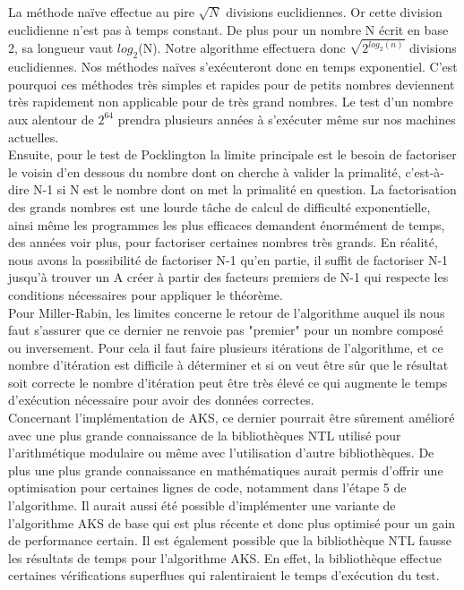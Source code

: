 		La méthode naïve effectue au pire $\sqrt{N}$ divisions euclidiennes. Or cette division euclidienne n'est pas à temps constant. De plus pour un nombre N écrit en base 2, sa longueur vaut $log_2$(N). Notre algorithme effectuera donc $\sqrt{2^{log_2(n)}}$ divisions euclidiennes. Nos méthodes naïves s’exécuteront donc en temps exponentiel. C'est pourquoi ces méthodes très simples et rapides pour de petits nombres deviennent très rapidement non applicable pour de très grand nombres. Le test d'un nombre aux alentour de $2^{64}$ prendra plusieurs années à s’exécuter même sur nos machines actuelles.\\
		
		Ensuite, pour le test de Pocklington la limite principale est le besoin de factoriser le voisin d’en dessous du nombre dont on cherche à valider la primalité, c’est-à-dire N-1 si N est le nombre dont on met la primalité en question. La factorisation des grands nombres est une lourde tâche de calcul de difficulté exponentielle, ainsi même les programmes les plus efficaces demandent énormément de temps, des années voir plus, pour factoriser certaines nombres très grands.
En réalité, nous avons la possibilité de factoriser N-1 qu’en partie, il suffit de factoriser N-1 jusqu’à trouver un A créer à partir des facteurs premiers de N-1 qui respecte les conditions nécessaires pour appliquer le théorème.\\

		Pour Miller-Rabin, les limites concerne le retour de l'algorithme auquel ils nous faut s'assurer que ce dernier ne renvoie pas "premier" pour un nombre composé ou inversement. Pour cela il faut faire plusieurs itérations de l'algorithme, et ce nombre d'itération est difficile à déterminer et si on veut être sûr que le résultat soit correcte le nombre d'itération peut être très élevé ce qui augmente le temps d'exécution nécessaire pour avoir des données correctes.\\	
		
		Concernant l'implémentation de AKS, ce dernier pourrait être sûrement amélioré avec une plus grande connaissance de la bibliothèques NTL utilisé pour l'arithmétique modulaire ou même avec l'utilisation d'autre bibliothèques. De plus une plus grande connaissance en mathématiques aurait permis d'offrir une optimisation pour certaines lignes de code, notamment dans l'étape 5 de l’algorithme. Il aurait aussi été possible d'implémenter une variante de l’algorithme AKS de base qui est plus récente et donc plus optimisé pour un gain de performance certain.
Il est également possible que la bibliothèque NTL fausse les résultats de temps pour l'algorithme AKS. En effet, la bibliothèque effectue certaines vérifications superflues qui ralentiraient le temps d’exécution du test.\\
		
